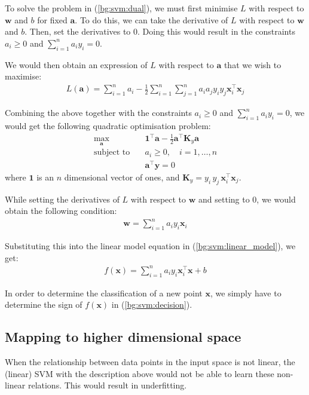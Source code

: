 \documentclass[12pt, twoside, a4paper]{report}
\def\vec{\boldsymbol}
\begin{document}
To solve the problem in (\ref{bg:svm:dual}), we must first minimise $L$ with respect to $\vec w$ and $b$ for fixed $\vec a$. To do this, we can take the derivative of $L$ with respect to $\vec w$ and $b$. Then, set the derivatives to 0. Doing this would result in the constraints $a_i \geq 0$ and $\sum_{i=1}^n a_i y_i = 0$.

We would then obtain an expression of $L$ with respect to $\vec a$ that we wish to maximise:
\begin{align*}
L(\vec a) = \sum_{i=1}^n a_i - \frac{1}{2} \sum_{i=1}^n \sum_{j=1}^n a_i a_j y_i y_j \vec{x}_i^\top \vec{x}_j
\end{align*}

Combining the above together with the constraints $a_i \geq 0$ and $\sum_{i=1}^n a_i y_i = 0$, we would get the following quadratic optimisation problem:
\begin{align*}
\max_{\vec a} \quad &\vec{1}^\top \vec a - \frac{1}{2} \vec{a}^\top \vec{K}_y \vec{a} \\
\text{subject to} \quad &a_i \geq 0, \quad i = 1, \dots , n \\
&\vec{a}^\top \vec y = 0
\end{align*}
where $\vec{1}$ is an $n$ dimensional vector of ones, and $\vec{K}_y = y_i \, y_j \, \vec{x}_i^\top \vec{x}_j$.

While setting the derivatives of $L$ with respect to $\vec{w}$ and setting to 0, we would obtain the following condition:
\begin{align*}
\vec{w} = \sum_{i=1}^n a_i y_i \vec{x}_i
\end{align*}

Substituting this into the linear model equation in (\ref{bg:svm:linear_model}), we get:
\begin{align}
f(\vec{x}) = \sum_{i=1}^n a_i y_i \vec{x}_i^\top \vec{x} + b \label{bg:svm:decision}
\end{align}

In order to determine the classification of a new  point $\vec{x}$, we simply have to determine the sign of $f(\vec{x})$ in (\ref{bg:svm:decision}).

\subsection{Mapping to higher dimensional space}
When the relationship between data points in the input space is not linear, the (linear) SVM with the description above would not be able to learn these non-linear relations. This would result in underfitting.
\end{document}

